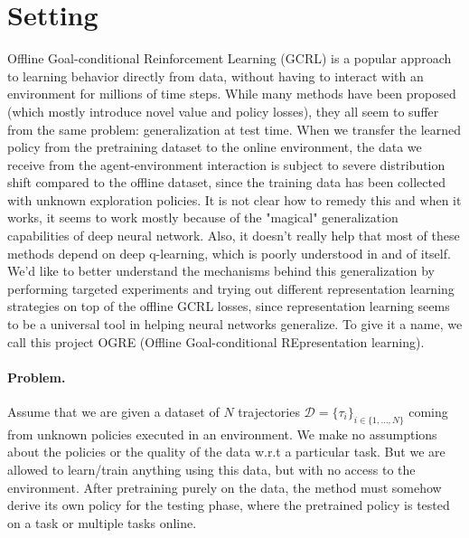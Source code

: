 \documentclass{article}
\theoremstyle{plain}
\theoremstyle{definition}
\theoremstyle{remark}
\begin{document}
\section{Setting}
Offline Goal-conditional Reinforcement Learning (GCRL) is a popular approach to learning behavior directly from data, without having to interact with an environment for millions of time steps. 
While many methods have been proposed (which mostly introduce novel value and policy losses), they all seem to suffer from the same problem: generalization at test time. 
When we transfer the learned policy from the pretraining dataset to the online environment, the data we receive from the agent-environment interaction is subject to severe distribution shift compared to the offline dataset, since the training data has been collected with unknown exploration policies. 
It is not clear how to remedy this and when it works, it seems to work mostly because of the "magical" generalization capabilities of deep neural network. Also, it doesn't really help that most of these methods depend on deep q-learning, which is poorly understood in and of itself. 
We'd like to better understand the mechanisms behind this generalization by performing targeted experiments and trying out different representation learning strategies on top of the offline GCRL losses, since representation learning seems to be a universal tool in helping neural networks generalize. 
To give it a name, we call this project OGRE (Offline Goal-conditional REpresentation learning).

\paragraph{Problem.} Assume that we are given a dataset of $N$ trajectories $\mathcal{D} = \{\tau_i\}_{i\in\{1,...,N\}}$ coming from unknown policies executed in an environment. We make no assumptions about the policies or the quality of the data w.r.t a particular task. 
But we are allowed to learn/train anything using this data, but with no access to the environment. 
After pretraining purely on the data, the method must somehow derive its own policy for the testing phase, where the pretrained policy is tested on a task or multiple tasks online. 
\end{document}
